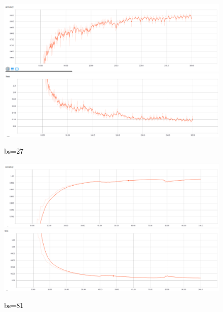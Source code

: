 \documentclass{article}
\begin{document}
\begin{figure}[h!]
	\caption{bs=27}
	\centering
	\includegraphics[width=\textwidth]{acc_log-model_1AG-gsbb_2C1-bs27-xyz-color_1norm-2048-mat}
	\includegraphics[width=\textwidth]{loss_log-model_1AG-gsbb_2C1-bs27-xyz-color_1norm-2048-mat}
\end{figure}
\begin{figure}[h!]
	\centering
	\caption{bs=81}
	\includegraphics[width=\textwidth]{acc_log-model_1AG-gsbb_2C1-bs81-xyz-color_1norm-2048-mat}
	\includegraphics[width=\textwidth]{loss_log-model_1AG-gsbb_2C1-bs81-xyz-color_1norm-2048-mat}
\end{figure}
\end{document}
